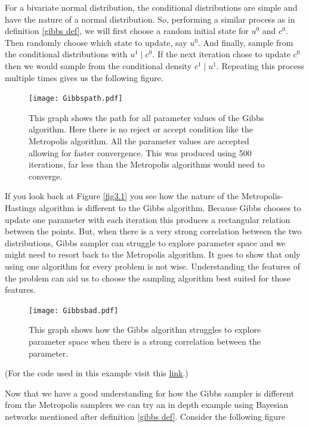 \documentclass[12pt,twoside]{report}   %
\begin{document}
For a bivariate normal distribution, the conditional distributions are simple and have the nature of a normal distribution. So, performing a similar process as in definition \ref{gibbs def}, we will first choose a random initial state for $u^0$ and $c^0$. Then randomly choose which state to update, say $u^0$. And finally, sample from the conditional distributions with $u^1\mid c^0$. If the next iteration chose to update $c^0$ then we would sample from the conditional density $c^1\mid u^1$. Repeating this process multiple times gives us the following figure.
\begin{figure}[H]
\centering
\texttt{[image: Gibbspath.pdf]}
\caption{This graph shows the path for all parameter values of the Gibbs algorithm. Here there is no reject or accept condition like the Metropolis algorithm. All the parameter values are accepted allowing for faster convergence. This was produced using 500 iterations, far less than the Metropolis algorithms would need to converge.}
\label{fig3.5}
\end{figure}
If you look back at Figure \ref{fig3.1} you see how the nature of the Metropolis-Hastings algorithm is different to the Gibbs algorithm. Because Gibbs chooses to update one parameter with each iteration this produces a rectangular relation between the points. But, when there is a very strong correlation between the two distributions, Gibbs sampler can struggle to explore parameter space and we might need to resort back to the Metropolis algorithm. It goes to show that only using one algorithm for every problem is not wise. Understanding the features of the problem can aid us to choose the sampling algorithm best suited for those features.
\begin{figure}[H]
\centering
\texttt{[image: Gibbsbad.pdf]}
\caption{This graph shows how the Gibbs algorithm struggles to explore parameter space when there is a strong correlation between the parameter.}
\label{fig3.6}
\end{figure}
(For the code used in this example visit this \href{https://github.com/iMikeT/MathProject2/tree/master/R%20Code/Gibbs/Crime%20%26%20Unemployment%20Example}{link}.)

Now that we have a good understanding for how the Gibbs sampler is different from the Metropolis samplers we can try an in depth example using Bayesian networks mentioned after definition \ref{gibbs def}. Consider the following figure
\end{document}
